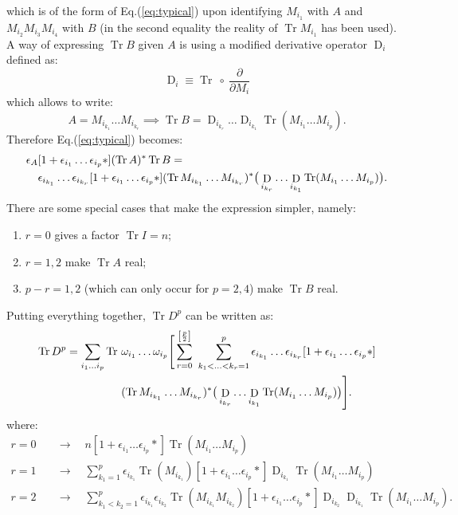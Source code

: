 \documentclass[12pt,a4paper]{article}
\DeclareMathOperator{\Tr}{Tr}
\DeclareMathOperator{\D}{D}
\begin{document}
which is of the form of Eq.(\ref{eq:typical}) upon identifying $M_{i_1}$ with $A$ and $M_{i_2} M_{i_3} M_{i_4}$ with $B$ (in the second equality the reality of $\Tr M_{i_1}$ has been used). \newline
A way of expressing $\Tr B$ given $A$ is using a modified derivative operator $\D_i$ defined as:
\begin{equation}
\D_i \equiv \Tr \ \circ \ \frac{\partial}{\partial M_i} 
\end{equation}
which allows to write:
\begin{equation}
A = M_{i_{k_1}} \ldots M_{i_{k_r}} \implies \Tr B = \D_{i_{k_r}} \ldots \D_{i_{k_1}} \Tr (M_{i_1} \ldots M_{i_p}).
\end{equation}
Therefore Eq.(\ref{eq:typical}) becomes:
\begin{align}
\epsilon_A&[1+ \epsilon_{i_1} \ldots \epsilon_{i_p} *] (\Tr A)^* \Tr B = \notag \\
&\epsilon_{i_{k_1}} \ldots \epsilon_{i_{k_r}}[1 + \epsilon_{i_1} \ldots \epsilon_{i_p} * ] (\Tr M_{i_{k_1}} \ldots M_{i_{k_r}})^* \big( \D_{i_{k_r}} \ldots \D_{i_{k_1}} \Tr (M_{i_1} \ldots M_{i_p}) \big).
\end{align}
There are some special cases that make the expression simpler, namely:
\begin{enumerate}
\item $r=0$ gives a factor $\Tr I = n$;
\item $r=1, 2$ make $\Tr A$ real;
\item $p-r=1, 2$ (which can only occur for $p=2, 4$) make $\Tr B$ real. 
\end{enumerate}
Putting everything together, $\Tr D^p$ can be written as:
\begin{align}
\Tr D^p = \sum_{i_1 \ldots i_p} \Tr \ &\omega_{i_1} \ldots \omega_{i_p} \Bigg[ \sum_{r=0}^{\left[\frac{p}{2}\right]} \ \sum_{k_1 < \ldots < k_r = 1}^p  \epsilon_{i_{k_1}} \ldots \epsilon_{i_{k_r}} [1 + \epsilon_{i_1} \ldots \epsilon_{i_p} * ] \notag \\
&(\Tr M_{i_{k_1}} \ldots M_{i_{k_r}})^* \big( \D_{i_{k_r}} \ldots \D_{i_{k_1}} \Tr (M_{i_1} \ldots M_{i_p}) \big) \Bigg]. \notag \\
\end{align}
where:
\begin{align}
r=0 \quad &\longrightarrow \quad n[1+\epsilon_{i_1} \ldots \epsilon_{i_p}*]\Tr (M_{i_1} \ldots M_{i_p}) \\
r=1 \quad &\longrightarrow \quad \sum_{k_1 = 1}^p \epsilon_{i_{k_1}}  \Tr (M_{i_{k_1}}) [1+\epsilon_{i_1} \ldots \epsilon_{i_p}*] \D_{i_{k_1}} \Tr (M_{i_1} \ldots M_{i_p}) \\
r=2 \quad &\longrightarrow \quad \sum_{k_1<k_2 = 1}^p \epsilon_{i_{k_1}} \epsilon_{i_{k_2}}  \Tr (M_{i_{k_1}} M_{i_{k_2}}) [1+\epsilon_{i_1} \ldots \epsilon_{i_p}*] \D_{i_{k_2}} \D_{i_{k_1}} \Tr (M_{i_1} \ldots M_{i_p}).
\end{align}
\end{document}
